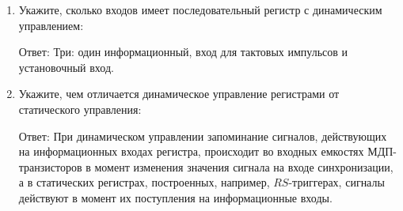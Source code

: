 \documentclass[spec, och, labwork]{shiza}
\begin{document}
\begin{enumerate}
    \item Укажите, сколько входов имеет последовательный регистр с динамическим управлением:
    
    Ответ: Три: один информационный, вход для тактовых импульсов и установочный вход.

    \item Укажите, чем отличается динамическое управление регистрами от статического управления:
    
    Ответ: При динамическом управлении запоминание сигналов, действующих на информационных входах регистра, происходит во входных емкостях МДП-транзисторов в момент изменения значения сигнала на входе синхронизации, а в статических регистрах, построенных, например, $RS$-триггерах, сигналы действуют в момент их поступления на информационные входы.
    
  \end{enumerate}
\end{document}
